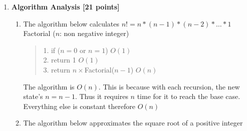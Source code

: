 \documentclass[12pt]{article}
\begin{document}
\begin{enumerate}
\begin{enumerate}
\\\\\\\\\\\\\\\\\\\\\\\\\\\\\\\\\\\\\\\\\\\\\\\\\\
\end{enumerate}
\item
\textbf{Algorithm Analysis [21 points]}

\begin{enumerate}
\item The algorithm below calculates $n!=n*(n-1)*(n-2)*\ldots*1$ \\

Factorial ($n$: non negative integer) 
\begin{quote}
1.	\hspace{0.1in}	if ($n = 0$ or $n = 1$)   $O(1)$\\
2.	\hspace{0.3in}		return 1 $O(1)$\\
3.	\hspace{0.1in}	return $n \times $Factorial($n-1$) $O(n)$
\end{quote}

The algorithm is $O(n)$. This is because with each recursion, the new
state's $n = n -1$. Thus it requires $n$ time for it to reach the base
case. Everything else is constant therefore $O(n)$
\newpage

\item
The algorithm below approximates the square root of a positive integer \\


\end{enumerate}
\end{enumerate}
\end{document}
